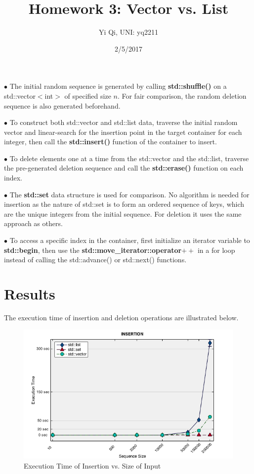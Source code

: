 \documentclass[11pt, oneside]{article}   	%
\title{Homework 3: Vector vs. List}
\author{Yi Qi, UNI: yq2211}
\date{2/5/2017}							%
\begin{document}
\maketitle

$\bullet$ The initial random sequence is generated by calling \textbf{std::shuffle()} on a std::vector\(<\)int\(>\) of specified size \(n\). For fair comparison, the random deletion sequence is also generated beforehand.

$\bullet$ To construct both std::vector and std::list data, traverse the initial random vector and linear-search for the insertion point in the target container for each integer, then call the \textbf{std::insert()} function of the container to insert.

$\bullet$ To delete elements one at a time from the std::vector and the std::list, traverse the pre-generated deletion sequence and call the \textbf{std::erase()} function on each index.

$\bullet$ The \textbf{std::set} data structure is used for comparison. No algorithm is needed for insertion as the nature of std::set is to form an ordered sequence of keys, which are the unique integers from the initial sequence. For deletion it uses the same approach as others.

$\bullet$ To access a specific index in the container, first initialize an iterator variable to \textbf{std::begin}, then use the \textbf{std::move\_iterator::operator}\(\mathbf{++}\) in a for loop instead of calling the std::advance() or std::next() functions.


\section*{Results}

The execution time of insertion and deletion operations are illustrated below. 

\begin{figure}[H]
\includegraphics[width=\linewidth]{plot_insertion.png}
\caption{Execution Time of Insertion vs. Size of Input}
\end{figure}
\end{document}
